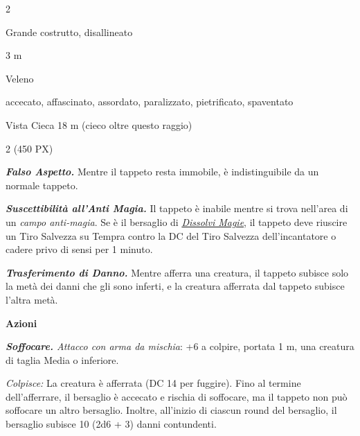 \begin{multicols}{2}
{
\begin{description}[noitemsep, topsep=0pt, parsep=0pt, partopsep=0pt, itemsep=1pt, leftmargin=2.35cm,  labelwidth=2.2cm, itemindent=0cm, listparindent=0pt] %
\setlength{\baselineskip}{10pt}
\item[\textbf{Taglia/Tipo}] Grande costrutto, disallineato
\item[\textbf{Caratt.}] 
\item[\textbf{Punti Ferita}] 
\item[\textbf{Movimento}] 3 m
\item[\textbf{Tiri Salvez.}] 
\item[\textbf{Imm. Danni}] Veleno
\item[\textbf{Immunità}] accecato, affascinato, assordato, paralizzato, pietrificato, spaventato
\item[\textbf{Sensi}] Vista Cieca 18 m (cieco oltre questo raggio)
\item[\textbf{Sfida}] 2 (450 PX)
\end{description}
\smallskip

\emph{\textbf{Falso Aspetto.}} Mentre il tappeto resta immobile, è indistinguibile da un normale tappeto.

\emph{\textbf{Suscettibilità all'Anti Magia.}} Il tappeto è inabile mentre si trova nell'area di un \emph{campo anti-magia}. Se è il bersaglio di \emph{\hyperlink{Dissolvi Magie}{Dissolvi Magie}}, il tappeto deve riuscire un Tiro Salvezza su Tempra contro la DC del Tiro Salvezza dell'incantatore o cadere privo di sensi per 1 minuto.

\emph{\textbf{Trasferimento di Danno.}} Mentre afferra una creatura, il tappeto subisce solo la metà dei danni che gli sono inferti, e la creatura afferrata dal tappeto subisce l'altra metà.

\textbf{Azioni}

\emph{\textbf{Soffocare.} Attacco con arma da mischia}: +6 a colpire, portata 1 m, una creatura di taglia Media o inferiore.

\emph{Colpisce:} La creatura è afferrata (DC 14 per fuggire). Fino al termine dell'afferrare, il bersaglio è accecato e rischia di soffocare, ma il tappeto non può soffocare un altro bersaglio. Inoltre, all'inizio di ciascun round del bersaglio, il bersaglio subisce 10 (2d6 + 3) danni contundenti.

}
\end{multicols}
